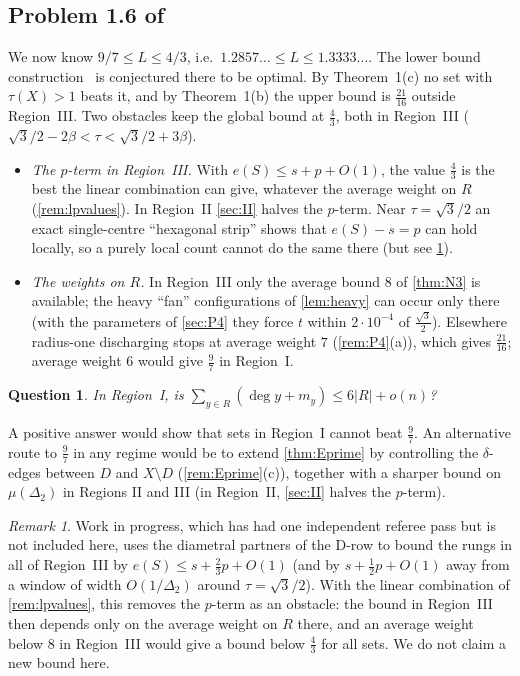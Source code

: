 \documentclass[11pt]{amsart}
\newtheorem{question}[theorem]{Question}
\theoremstyle{definition}
\theoremstyle{remark}
\newtheorem{remark}[theorem]{Remark}
\newcommand{\Dt}{\Delta_2}
\newcommand{\mult}{\mu}
\begin{document}
\subsection*{\texorpdfstring{Problem 1.6 of~\cite{CDL25}}{Problem 1.6 of CDL}}
We now know $9/7\le L\le4/3$, i.e.\ $1.2857\ldots\le L\le1.3333\ldots$. The lower bound construction~\cite{ienjoymath} is conjectured there to be optimal. By Theorem~1(c) no set with $\tau(X)>1$ beats it, and by Theorem~1(b) the upper bound is $\frac{21}{16}$ outside Region~III. Two obstacles keep the global bound at $\frac43$, both in Region~III ($\sqrt3/2-2\beta<\tau<\sqrt3/2+3\beta$).
\begin{itemize}[leftmargin=2em]
\item \emph{The $p$-term in Region~III.} With $e(S)\le s+p+O(1)$, the value $\frac43$ is the best the linear combination can give, whatever the average weight on $R$ (\cref{rem:lpvalues}). In Region~II \cref{sec:II} halves the $p$-term. Near $\tau=\sqrt3/2$ an exact single-centre ``hexagonal strip'' shows that $e(S)-s=p$ can hold locally, so a purely local count cannot do the same there (but see \cref{rem:regionIII}).
\item \emph{The weights on $R$.} In Region~III only the average bound $8$ of \cref{thm:N3} is available; the heavy ``fan'' configurations of \cref{lem:heavy} can occur only there (with the parameters of \cref{sec:P4} they force $t$ within $2\cdot10^{-4}$ of $\frac{\sqrt3}2$). Elsewhere radius-one discharging stops at average weight $7$ (\cref{rem:P4}(a)), which gives $\frac{21}{16}$; average weight $6$ would give $\frac97$ in Region~I.
\end{itemize}
\begin{question}\label{q:avg6}
In Region~I, is $\sum_{y\in R}(\deg y+m_y)\le6|R|+o(n)$?
\end{question}
A positive answer would show that sets in Region~I cannot beat $\frac97$. An alternative route to $\frac97$ in any regime would be to extend \cref{thm:Eprime} by controlling the $\delta$-edges between $D$ and $X\setminus D$ (\cref{rem:Eprime}(c)), together with a sharper bound on $\mult(\Dt)$ in Regions II and III (in Region~II, \cref{sec:II} halves the $p$-term).

\begin{remark}\label{rem:regionIII}
Work in progress, which has had one independent referee pass but is not included here, uses the diametral partners of the D-row to bound the rungs in all of Region~III by $e(S)\le s+\frac23p+O(1)$ (and by $s+\frac12p+O(1)$ away from a window of width $O(1/\Dt)$ around $\tau=\sqrt3/2$). With the linear combination of \cref{rem:lpvalues}, this removes the $p$-term as an obstacle: the bound in Region~III then depends only on the average weight on $R$ there, and an average weight below $8$ in Region~III would give a bound below $\frac43$ for all sets. We do not claim a new bound here.
\end{remark}
\end{document}
